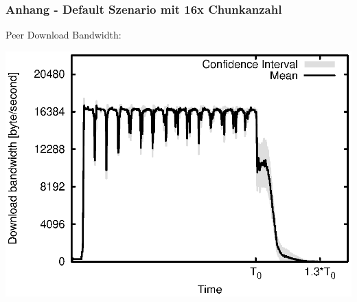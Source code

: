 \begin{frame}
  \frametitle{Anhang - Default Szenario mit 16x Chunkanzahl}
  Peer Download Bandwidth:
  
  \begin{center}
    \includegraphics[width=1\textwidth]{fig/plots/scenario_17_chunk_count_fac_16/plots/GeneratedMeanCurrentDownloadBandwidth.csv.eps}
  \end{center}
\end{frame}
